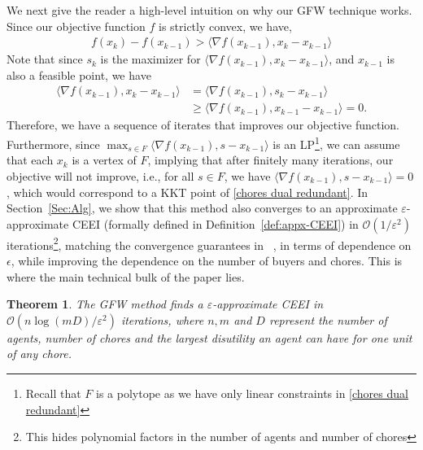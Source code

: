 \documentclass[format=acmsmall,authorversion]{acmart}
\newtheorem*{theorem*}{Theorem}
\begin{document}
We next give the reader a high-level intuition on why our GFW technique works. Since our objective function $f$ is strictly convex, we have,
\begin{align*}
    f(x_k) - f(x_{k-1}) > \langle \nabla f(x_{k-1}), x_{k} - x_{k-1} \rangle
\end{align*}
Note that since $s_k$ is the maximizer for $\langle \nabla f(x_{k-1}), x_{k} - x_{k-1} \rangle$, and $x_{k-1}$ is also a feasible point, we have 
\begin{align*}
  \langle \nabla f(x_{k-1}), x_{k} - x_{k-1} \rangle  &= \langle \nabla f(x_{k-1}), s_{k} - x_{k-1} \rangle\\
                                                      &\geq \langle \nabla f(x_{k-1}), x_{k-1} - x_{k-1} \rangle = 0.
\end{align*}
Therefore, we have a sequence of iterates that improves our objective function. Furthermore, since $\max_{s \in F} \langle \nabla f(x_{k-1}), s - x_{k-1} \rangle$ is an LP\footnote{Recall that $F$ is a polytope as we have only linear constraints in \ref{chores dual redundant}}, we can assume that each $x_k$ is a vertex of $F$, implying that after finitely many iterations, our objective will not improve, i.e., for all $s \in F$, we have $\langle \nabla f(x_{k-1}), s - x_{k-1} \rangle = 0$, which would correspond to a KKT point of \ref{chores dual redundant}.  In Section~\ref{Sec:Alg}, we show that this method also converges to an approximate $\varepsilon$-approximate CEEI (formally defined in Definition~\ref{def:appx-CEEI}) in $\mathcal{O}(1/\varepsilon^2)$ iterations\footnote{This hides polynomial factors in the number of agents and number of chores}, matching the convergence guarantees in ~\cite{boodaghians2022polynomial, ChaudhuryGMM22}, in terms of dependence on $\epsilon$, while improving the dependence on the number of buyers and chores. This is where the main technical bulk of the paper lies.


\begin{theorem*}
    \label{theorem-intro-alg}
    The GFW method finds a $\varepsilon$-approximate CEEI in $\mathcal O(n \log (mD)/\varepsilon^2)$ iterations, where $n,m$ and $D$ represent the number of agents, number of chores and the largest disutility an agent can have for one unit of any chore.
\end{theorem*}
\end{document}
